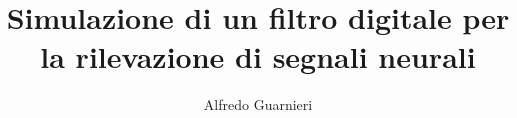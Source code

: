 \begin{ThesisTitlePage}
\author{Alfredo Guarnieri}
\title{Simulazione di un filtro digitale per la rilevazione di segnali neurali}
%

\end{ThesisTitlePage}

